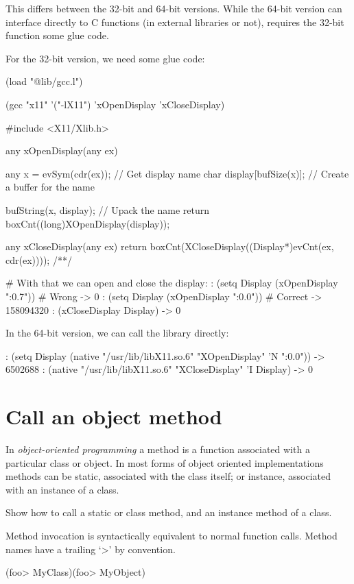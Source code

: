 \begin{wideverbatim}

This differs between the 32-bit and 64-bit versions. While the 64-bit version
can interface directly to C functions (in external libraries or not), requires
the 32-bit function some glue code.

For the 32-bit version, we need some glue code:

(load "@lib/gcc.l")

(gcc "x11" '("-lX11") 'xOpenDisplay 'xCloseDisplay)

#include <X11/Xlib.h>

any xOpenDisplay(any ex) {
   any x = evSym(cdr(ex));    // Get display name
   char display[bufSize(x)];  // Create a buffer for the name

   bufString(x, display);     // Upack the name
   return boxCnt((long)XOpenDisplay(display));
}

any xCloseDisplay(any ex) {
   return boxCnt(XCloseDisplay((Display*)evCnt(ex, cdr(ex))));
}
/**/

# With that we can open and close the display:
: (setq Display (xOpenDisplay ":0.7"))   # Wrong
-> 0
: (setq Display (xOpenDisplay ":0.0"))   # Correct
-> 158094320
: (xCloseDisplay Display)
-> 0

In the 64-bit version, we can call the library directly:

: (setq Display (native "/usr/lib/libX11.so.6" "XOpenDisplay" 'N ":0.0"))
-> 6502688
: (native "/usr/lib/libX11.so.6" "XCloseDisplay" 'I Display)
-> 0

\end{wideverbatim}


\pagebreak{}
\section*{Call an object method}

In \emph{object-oriented programming} a method is a function
associated with a particular class or object. In most forms of object
oriented implementations methods can be static, associated with the
class itself; or instance, associated with an instance of a class.

Show how to call a static or class method, and an instance method of a
class.

\begin{wideverbatim}

Method invocation is syntactically equivalent to normal function calls.
Method names have a trailing `>' by convention.

(foo> MyClass)(foo> MyObject)

\end{wideverbatim}


